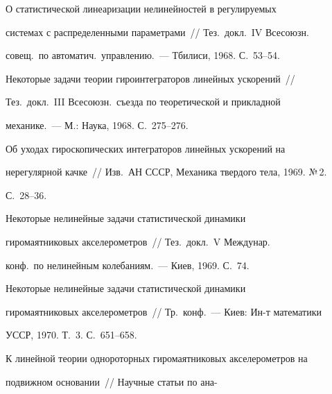  О статистической линеаризации нелинейностей в регули\-ру\-емых


системах с распределенными параметрами~// Тез.\ докл.\ IV Всесоюзн.\


совещ.\ по автоматич.\ управлению.~--- Тбилиси, 1968. С.~53--54.





 Некоторые задачи теории гироинтеграторов линейных ускорений~//


Тез.\ докл.\ III Всесоюзн.\ съезда по теоретической и прикладной


механике.~--- М.: Наука, 1968. С.~275--276.










 Об уходах гироскопических интеграторов линейных ускорений на


нерегулярной качке~// Изв.\ АН СССР, Механика твердого тела, 1969. №\,2.


С.~28--36.





 Некоторые нелинейные задачи статистической динамики


гиромаятниковых акселерометров~// Тез.\ докл.\ V Междунар.\


конф.\ по нелинейным колебаниям.~--- Киев, 1969. С.~74.










 Некоторые нелинейные задачи статистической динамики


гиромаятниковых акселерометров~// Тр.\ конф.~--- Киев: Ин-т математики


УССР, 1970. Т.~3. С.~651--658.





 К линейной теории однороторных гиромаятниковых акселерометров на


подвижном основании~// Научные статьи по ана-\linebreak


\vspace*{-12pt}





\pagebreak





